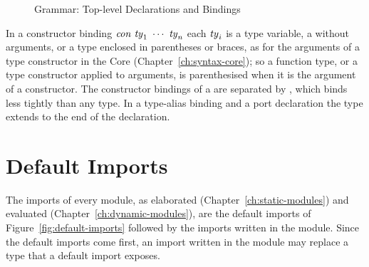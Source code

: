 \begin{figure}[htbp]
\centering
\begin{grammar}
\end{grammar}
\caption{Grammar: Top-level Declarations and Bindings}\label{fig:grammar-top-level-declarations}
\end{figure}

In a constructor binding $\con\ \ty_1\ \cdots\ \ty_n$ each $\mathit{ty}_i$ is a type
variable, a \longtycon{} without arguments, or a type enclosed in parentheses
or braces, as for the arguments of a type constructor in the Core
(Chapter~\ref{ch:syntax-core}); so a function type, or a type constructor
applied to arguments, is parenthesised when it is the argument of a
constructor. The constructor bindings of a \conbind{} are separated by
\kw{|}, which binds less tightly than any type. In a type-alias binding and a
port declaration the type extends to the end of the declaration.

\section{Default Imports}\label{sec:syntax-modules-default-imports}

The imports of every module, as elaborated (Chapter~\ref{ch:static-modules})
and evaluated (Chapter~\ref{ch:dynamic-modules}), are the default imports of
Figure~\ref{fig:default-imports} followed by the imports written in the
module. Since the default imports come first, an import written in the module
may replace a type that a default import exposes.

